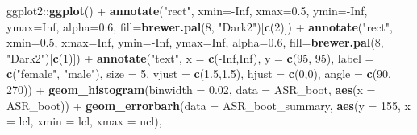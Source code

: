 \documentclass[]{article}
\newenvironment{Shaded}{\begin{snugshade}}{\end{snugshade}}
\newcommand{\KeywordTok}[1]{\textcolor[rgb]{0.13,0.29,0.53}{\textbf{{#1}}}}
\newcommand{\DataTypeTok}[1]{\textcolor[rgb]{0.13,0.29,0.53}{{#1}}}
\newcommand{\DecValTok}[1]{\textcolor[rgb]{0.00,0.00,0.81}{{#1}}}
\newcommand{\FloatTok}[1]{\textcolor[rgb]{0.00,0.00,0.81}{{#1}}}
\newcommand{\StringTok}[1]{\textcolor[rgb]{0.31,0.60,0.02}{{#1}}}
\newcommand{\OtherTok}[1]{\textcolor[rgb]{0.56,0.35,0.01}{{#1}}}
\newcommand{\NormalTok}[1]{{#1}}
\begin{document}
\begin{Shaded}
\begin{Highlighting}[]
\NormalTok{ggplot2::}\KeywordTok{ggplot}\NormalTok{() +}
\StringTok{          }\KeywordTok{annotate}\NormalTok{(}\StringTok{"rect"}\NormalTok{, }\DataTypeTok{xmin=}\NormalTok{-}\OtherTok{Inf}\NormalTok{, }\DataTypeTok{xmax=}\FloatTok{0.5}\NormalTok{, }\DataTypeTok{ymin=}\NormalTok{-}\OtherTok{Inf}\NormalTok{, }\DataTypeTok{ymax=}\OtherTok{Inf}\NormalTok{, }\DataTypeTok{alpha=}\FloatTok{0.6}\NormalTok{,}
                   \DataTypeTok{fill=}\KeywordTok{brewer.pal}\NormalTok{(}\DecValTok{8}\NormalTok{, }\StringTok{"Dark2"}\NormalTok{)[}\KeywordTok{c}\NormalTok{(}\DecValTok{2}\NormalTok{)]) +}
\StringTok{          }\KeywordTok{annotate}\NormalTok{(}\StringTok{"rect"}\NormalTok{, }\DataTypeTok{xmin=}\FloatTok{0.5}\NormalTok{, }\DataTypeTok{xmax=}\OtherTok{Inf}\NormalTok{, }\DataTypeTok{ymin=}\NormalTok{-}\OtherTok{Inf}\NormalTok{, }\DataTypeTok{ymax=}\OtherTok{Inf}\NormalTok{, }\DataTypeTok{alpha=}\FloatTok{0.6}\NormalTok{,}
                   \DataTypeTok{fill=}\KeywordTok{brewer.pal}\NormalTok{(}\DecValTok{8}\NormalTok{, }\StringTok{"Dark2"}\NormalTok{)[}\KeywordTok{c}\NormalTok{(}\DecValTok{1}\NormalTok{)]) +}
\StringTok{          }\KeywordTok{annotate}\NormalTok{(}\StringTok{"text"}\NormalTok{, }\DataTypeTok{x =} \KeywordTok{c}\NormalTok{(-}\OtherTok{Inf}\NormalTok{,}\OtherTok{Inf}\NormalTok{), }\DataTypeTok{y =} \KeywordTok{c}\NormalTok{(}\DecValTok{95}\NormalTok{, }\DecValTok{95}\NormalTok{),}
                   \DataTypeTok{label =} \KeywordTok{c}\NormalTok{(}\StringTok{"female"}\NormalTok{, }\StringTok{"male"}\NormalTok{), }\DataTypeTok{size =} \DecValTok{5}\NormalTok{,}
                   \DataTypeTok{vjust =} \KeywordTok{c}\NormalTok{(}\FloatTok{1.5}\NormalTok{,}\FloatTok{1.5}\NormalTok{), }\DataTypeTok{hjust =} \KeywordTok{c}\NormalTok{(}\DecValTok{0}\NormalTok{,}\DecValTok{0}\NormalTok{), }\DataTypeTok{angle =} \KeywordTok{c}\NormalTok{(}\DecValTok{90}\NormalTok{, }\DecValTok{270}\NormalTok{)) +}
\StringTok{          }\KeywordTok{geom_histogram}\NormalTok{(}\DataTypeTok{binwidth =} \FloatTok{0.02}\NormalTok{, }\DataTypeTok{data =} \NormalTok{ASR_boot, }\KeywordTok{aes}\NormalTok{(}\DataTypeTok{x =} \NormalTok{ASR_boot)) +}
\StringTok{          }\KeywordTok{geom_errorbarh}\NormalTok{(}\DataTypeTok{data =} \NormalTok{ASR_boot_summary, }
                         \KeywordTok{aes}\NormalTok{(}\DataTypeTok{y =} \DecValTok{155}\NormalTok{, }\DataTypeTok{x =} \NormalTok{lcl, }\DataTypeTok{xmin =} \NormalTok{lcl, }\DataTypeTok{xmax =} \NormalTok{ucl), }

\end{Highlighting}
\end{Shaded}
\end{document}
